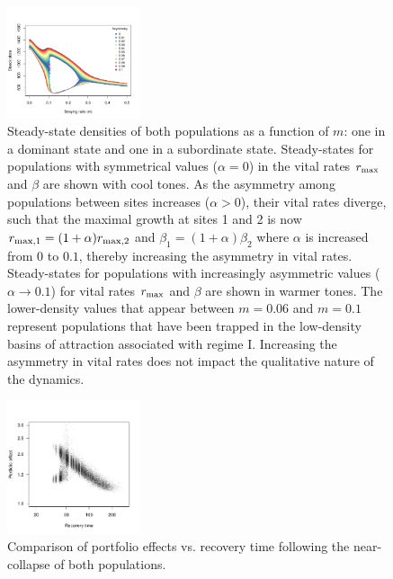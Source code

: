 \documentclass{revtex4}
\begin{document}
\begin{figure}
  \captionsetup{justification=raggedright,
singlelinecheck=false
}
\centering
\includegraphics[width=0.35\textwidth]{fig_density2.pdf}
\caption{
Steady-state densities of both populations as a function of $m$: one in a dominant state and one in a subordinate state.
Steady-states for populations with symmetrical values ($\alpha=0$) in the vital rates $r_{\rm max}$ and $\beta$ are shown with cool tones.
As the asymmetry among populations between sites increases ($\alpha>0$), their vital rates diverge, such that the maximal growth at sites 1 and 2 is now $r_{\rm max,1}=(1 + \alpha)r_{\rm max,2}$ and $\beta_1=(1+\alpha)\beta_2$ where $\alpha$ is increased from $0$ to $0.1$, thereby increasing the asymmetry in vital rates.
Steady-states for populations with increasingly asymmetric values ($\alpha\rightarrow 0.1$) for vital rates $r_{\rm max}$ and $\beta$ are shown in warmer tones.
The lower-density values that appear between $m=0.06$ and $m=0.1$ represent populations that have been trapped in the low-density basins of attraction associated with regime I.
Increasing the asymmetry in vital rates does not impact the qualitative nature of the dynamics.
} \label{fig:symmetry}
\end{figure}




\begin{figure}
  \captionsetup{justification=raggedright,
singlelinecheck=false
}
\centering
\includegraphics[width=0.35\textwidth]{fig_pevsrt.pdf}
\caption{
Comparison of portfolio effects vs. recovery time following the near-collapse of both populations.
} \label{fig:pevsrt}
\end{figure}
\end{document}
